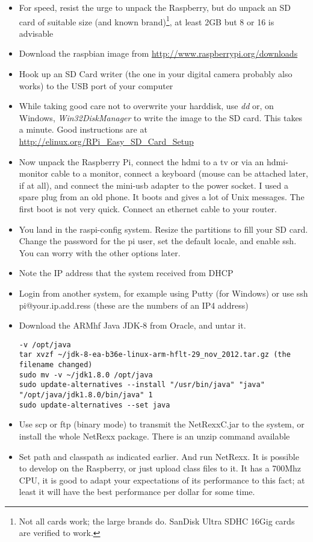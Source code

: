 \begin{itemize}
\item For speed, resist the urge to unpack the Raspberry, but do unpack an SD card of suitable size (and known brand)\footnote{Not all cards work; the large brands do. SanDisk Ultra SDHC 16Gig cards are verified to work.}, at least 2GB but 8 or 16 is advisable
\item Download the raspbian image from \url{http://www.raspberrypi.org/downloads}
\item Hook up an SD Card writer (the one in your digital camera probably also works) to the USB port of your computer
\item While taking good care not to overwrite your harddisk, use \emph{dd} or, on Windows, \emph{Win32DiskManager} to write the image to the SD card. This takes a minute. Good instructions are at \url{http://elinux.org/RPi_Easy_SD_Card_Setup}
\item Now unpack the Raspberry Pi, connect the hdmi to a tv or via an hdmi-monitor cable to a monitor, connect a keyboard (mouse can be attached later, if at all), and connect the mini-usb adapter to the power socket. I used a spare plug from an old phone. It boots and gives a lot of Unix messages. The first boot is not very quick. Connect an ethernet cable to your router.
\item You land in the raspi-config system. Resize the partitions to fill your SD card. Change the password for the pi user, set the default locale, and enable ssh. You can worry with the other options later.
\item Note the IP address that the system received from DHCP
\item Login from another system, for example using Putty (for Windows) or use ssh pi@your.ip.add.ress (these are the numbers of an IP4 address)
\item Download the ARMhf Java JDK-8 from Oracle, and untar it.
\begin{verbatim}
-v /opt/java 
tar xvzf ~/jdk-8-ea-b36e-linux-arm-hflt-29_nov_2012.tar.gz (the filename changed) 
sudo mv -v ~/jdk1.8.0 /opt/java 
sudo update-alternatives --install "/usr/bin/java" "java" "/opt/java/jdk1.8.0/bin/java" 1 
sudo update-alternatives --set java 
\end{verbatim}
\item Use scp or ftp (binary mode) to transmit the NetRexxC.jar to the system, or install the whole NetRexx package. There is an unzip command available
\item Set path and classpath as indicated earlier. And run NetRexx. It is possible to develop on the Raspberry, or just upload class files to it. It has a 700Mhz CPU, it is good to adapt your expectations of its performance to this fact; at least it will have the best performance per dollar for some time.
\end{itemize}